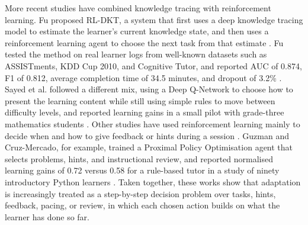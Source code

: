 More recent studies have combined knowledge tracing with reinforcement learning. Fu proposed RL-DKT, a system that first uses a deep knowledge tracing model to estimate the learner's current knowledge state, and then uses a reinforcement learning agent to choose the next task from that estimate \cite{fu_integrating_2025}. Fu tested the method on real learner logs from well-known datasets such as ASSISTments, KDD Cup 2010, and Cognitive Tutor, and reported AUC of 0.874, F1 of 0.812, average completion time of 34.5 minutes, and dropout of 3.2\% \cite{fu_integrating_2025}. Sayed et al. followed a different mix, using a Deep Q-Network to choose how to present the learning content while still using simple rules to move between difficulty levels, and reported learning gains in a small pilot with grade-three mathematics students \cite{sayed_ai-based_2023}. Other studies have used reinforcement learning mainly to decide when and how to give feedback or hints during a session \cite{deshmukh_developing_2025,guzman_developing_2025}. Guzman and Cruz-Mercado, for example, trained a Proximal Policy Optimisation agent that selects problems, hints, and instructional review, and reported normalised learning gains of 0.72 versus 0.58 for a rule-based tutor in a study of ninety introductory Python learners \cite{guzman_developing_2025}. Taken together, these works show that adaptation is increasingly treated as a step-by-step decision problem over tasks, hints, feedback, pacing, or review, in which each chosen action builds on what the learner has done so far.

